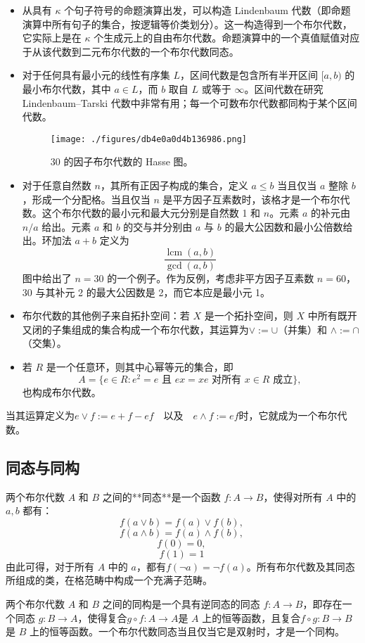 \begin{itemize}
\item 从具有 $\kappa$ 个句子符号的命题演算出发，可以构造 Lindenbaum 代数（即命题演算中所有句子的集合，按逻辑等价类划分）。这一构造得到一个布尔代数，它实际上是在 $\kappa$ 个生成元上的自由布尔代数。命题演算中的一个真值赋值对应于从该代数到二元布尔代数的一个布尔代数同态。
\item 对于任何具有最小元的线性有序集 $L$，区间代数是包含所有半开区间 $[a,b)$ 的最小布尔代数，其中 $a \in L$，而 $b$ 取自 $L$ 或等于 $\infty$。区间代数在研究 Lindenbaum–Tarski 代数中非常有用；每一个可数布尔代数都同构于某个区间代数。
\begin{figure}[ht]
\centering
\texttt{[image: ./figures/db4e0a0d4b136986.png]}
\caption{30 的因子布尔代数的 Hasse 图。} \label{fig_BRds_4}
\end{figure}
\item 对于任意自然数 $n$，其所有正因子构成的集合，定义 $a \le b$ 当且仅当 $a$ 整除 $b$，形成一个分配格。当且仅当 $n$ 是平方因子互素数时，该格才是一个布尔代数。这个布尔代数的最小元和最大元分别是自然数 1 和 $n$。元素 $a$ 的补元由 $n/a$ 给出。元素 $a$ 和 $b$ 的交与并分别由 $a$ 与 $b$ 的最大公因数和最小公倍数给出。环加法 $a + b$ 定义为
$$
\frac{\operatorname{lcm}(a, b)}{\operatorname{gcd}(a, b)}~
$$
图中给出了 $n = 30$ 的一个例子。作为反例，考虑非平方因子互素数 $n = 60$，30 与其补元 2 的最大公因数是 2，而它本应是最小元 1。
\item 布尔代数的其他例子来自拓扑空间：若 $X$ 是一个拓扑空间，则 $X$ 中所有既开又闭的子集组成的集合构成一个布尔代数，其运算为$\lor := \cup$（并集）和 $\land := \cap$（交集）。
\item 若 $R$ 是一个任意环，则其中心幂等元的集合，即
$$
A = \{ e \in R : e^2 = e \text{ 且 } ex = xe \text{ 对所有 } x \in R \text{ 成立} \},~
$$
也构成布尔代数。
\end{itemize}
当其运算定义为$e \lor f := e + f - ef \quad \text{以及} \quad e \land f := ef$时，它就成为一个布尔代数。
\subsection{同态与同构}
两个布尔代数 $A$ 和 $B$ 之间的**同态**是一个函数 $f : A \to B$，使得对所有 $A$ 中的 $a, b$ 都有：
$$
f(a \lor b) = f(a) \lor f(b),~
$$
$$
f(a \land b) = f(a) \land f(b),~
$$
$$
f(0) = 0,~
$$
$$
f(1) = 1~
$$
由此可得，对于所有 $A$ 中的 $a$，都有$f(\lnot a) = \lnot f(a)$。所有布尔代数及其同态所组成的类，在格范畴中构成一个充满子范畴。

两个布尔代数 $A$ 和 $B$ 之间的同构是一个具有逆同态的同态 $f : A \to B$，即存在一个同态 $g : B \to A$，使得复合$g \circ f : A \to A$是 $A$ 上的恒等函数，且复合$f \circ g : B \to B$是 $B$ 上的恒等函数。一个布尔代数同态当且仅当它是双射时，才是一个同构。
